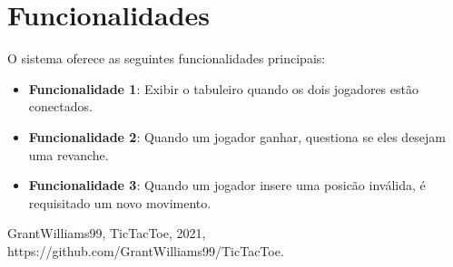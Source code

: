\documentclass[conference]{IEEEtran} %
\begin{document}
\section{Funcionalidades}

O sistema oferece as seguintes funcionalidades principais:

\begin{itemize}
    \item \textbf{Funcionalidade 1}: Exibir o tabuleiro quando os dois jogadores estão conectados.
    \item \textbf{Funcionalidade 2}: Quando um jogador ganhar, questiona se eles desejam uma revanche.
    \item \textbf{Funcionalidade 3}: Quando um jogador insere uma posicão inválida, é requisitado um novo
 movimento.
\end{itemize}

\begin{thebibliography}{1}
 GrantWilliams99, TicTacToe, 2021, https://github.com/GrantWilliams99/TicTacToe. 
\end{thebibliography}
\end{document}
